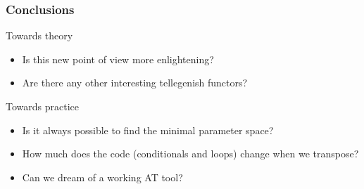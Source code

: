\documentclass[10pt]{beamer}
\begin{document}
\begin{frame}
  \frametitle{Conclusions}

  \begin{block}{Towards theory}
    \begin{itemize}
    \item Is this new point of view more enlightening?
    \item Are there any other interesting tellegenish functors?
    \end{itemize}
  \end{block}

  \begin{block}{Towards practice}
    \begin{itemize}
    \item Is it always possible to find the minimal parameter space?
    \item How much does the code (conditionals and loops) change when
      we transpose?
    \item Can we dream of a working AT tool?
    \end{itemize}
  \end{block}
\end{frame}
\end{document}
